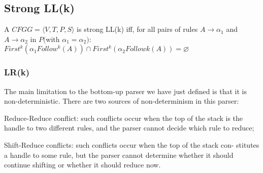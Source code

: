 \subsection{Strong LL(k)}    
A $CFG G= \langle V ,T ,P,S \rangle $ is strong LL(k) 
iff, for all pairs of rules $A→ \alpha_1$ and $A→ \alpha_2$ in $P ($with $\alpha_1 = \alpha_2)$:
$First^k ( \alpha_1 Follow^k (A) ) \cap First^k (\alpha_2 Followk (A) ) = \varnothing $



\subsubsection{LR(k)}
The main limitation to the bottom-up
parser we have just defined is that it is non-deterministic. There are two
sources of non-determinism in this parser:

Reduce-Reduce conflict: such conflicts occur when the top of the stack is
the handle to two different rules, and the parser cannot decide which
rule to reduce;

Shift-Reduce conflicts: such conflicts occur when the top of the stack con-
stitutes a handle to some rule, but the parser cannot determine whether
it should continue shifting or whether it should reduce now.











